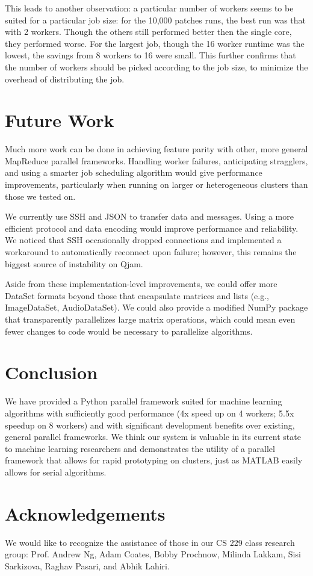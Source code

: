 \documentclass[%
  final,
  notitlepage,
  narroweqnarray,
  inline,
]{ieee}
\begin{document}
This leads to another observation: a particular number of workers seems to be
suited for a particular job size: for the 10,000 patches runs, the best run was
that with 2 workers. Though the others still performed better then the single
core, they performed worse. For the largest job, though the 16 worker runtime
was the lowest, the savings from 8 workers to 16 were small. This further
confirms that the number of workers should be picked according to the job size,
to minimize the overhead of distributing the job.

\section{Future Work}

Much more work can be done in achieving feature parity with other, more general
MapReduce parallel frameworks. Handling worker failures, anticipating
stragglers, and using a smarter job scheduling algorithm would give performance
improvements, particularly when running on larger or heterogeneous clusters
than those we tested on.

We currently use SSH and JSON to transfer data and messages. Using a more
efficient protocol and data encoding would improve performance and
reliability. We noticed that SSH occasionally dropped connections and
implemented a workaround to automatically reconnect upon failure; however, this
remains the biggest source of instability on Qjam.

Aside from these implementation-level improvements, we could offer more DataSet
formats beyond those that encapsulate matrices and lists (e.g., ImageDataSet,
AudioDataSet). We could also provide a modified NumPy package that
transparently parallelizes large matrix operations, which could mean even fewer
changes to code would be necessary to parallelize algorithms.


\section{Conclusion}

We have provided a Python parallel framework suited for machine learning
algorithms with sufficiently good performance (4x speed up on 4 workers; 5.5x
speedup on 8 workers) and with significant development benefits over existing,
general parallel frameworks.  We think our system is valuable in its current
state to machine learning researchers and demonstrates the utility of a
parallel framework that allows for rapid prototyping on clusters, just as
MATLAB easily allows for serial algorithms.

\section{Acknowledgements}
We would like to recognize the assistance of those in our CS 229 class research
group: Prof. Andrew Ng, Adam Coates, Bobby Prochnow, Milinda Lakkam, Sisi
Sarkizova, Raghav Pasari, and Abhik Lahiri.




\end{document}
